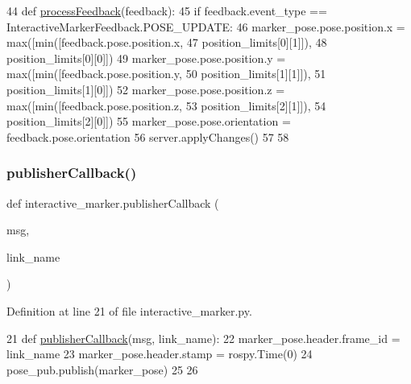 \begin{DoxyCode}
44 \textcolor{keyword}{def }\hyperlink{namespaceinteractive__marker_a6d5c00570a7279d0c91ed3fe895d2eb3}{processFeedback}(feedback):
45     \textcolor{keywordflow}{if} feedback.event\_type == InteractiveMarkerFeedback.POSE\_UPDATE:
46         marker\_pose.pose.position.x = max([min([feedback.pose.position.x,
47                                           position\_limits[0][1]]),
48                                           position\_limits[0][0]])
49         marker\_pose.pose.position.y = max([min([feedback.pose.position.y,
50                                           position\_limits[1][1]]),
51                                           position\_limits[1][0]])
52         marker\_pose.pose.position.z = max([min([feedback.pose.position.z,
53                                           position\_limits[2][1]]),
54                                           position\_limits[2][0]])
55         marker\_pose.pose.orientation = feedback.pose.orientation
56     server.applyChanges()
57 
58 
\end{DoxyCode}
\mbox{\label{namespaceinteractive__marker_a151d11429957edda146dfd5184be9cc4}} 
\subsubsection{\texorpdfstring{publisher\+Callback()}{publisherCallback()}}
{\footnotesize\ttfamily def interactive\+\_\+marker.\+publisher\+Callback (\begin{DoxyParamCaption}\item[{}]{msg,  }\item[{}]{link\+\_\+name }\end{DoxyParamCaption})}



Definition at line 21 of file interactive\+\_\+marker.\+py.


\begin{DoxyCode}
21 \textcolor{keyword}{def }\hyperlink{namespaceinteractive__marker_a151d11429957edda146dfd5184be9cc4}{publisherCallback}(msg, link\_name):
22     marker\_pose.header.frame\_id = link\_name
23     marker\_pose.header.stamp = rospy.Time(0)
24     pose\_pub.publish(marker\_pose)
25 
26 
\end{DoxyCode}


